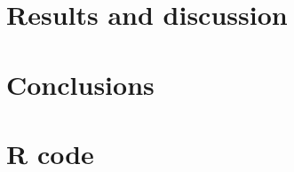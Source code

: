 \documentclass[
12pt, %
a4paper, %
oneside, %
headinclude,footinclude, %
BCOR5mm, %
]{scrartcl}
\begin{document}
\clearpage

\section{Results and discussion}

\clearpage

\section{Conclusions}

\clearpage

\section{R code}
\begin{lstlisting}


\end{lstlisting}




\renewcommand{\refname}{\spacedlowsmallcaps{References}} %




\end{document}
